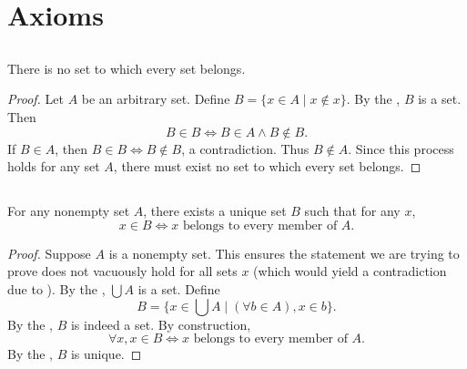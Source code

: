 \documentclass{report}
\begin{document}
\section{Axioms}%

\subsection{}%

\begin{theorem}[2A]

  There is no set to which every set belongs.


\end{theorem}

\begin{proof}

  Let $A$ be an arbitrary set.
  Define $B = \{ x \in A \mid x \not\in x \}$.
  By the , $B$ is a set.
  Then $$B \in B \iff B \in A \land B \not\in B.$$
  If $B \in A$, then $B \in B \iff B \not\in B$, a contradiction.
  Thus $B \not\in A$.
  Since this process holds for any set $A$, there must exist no set to which
    every set belongs.

\end{proof}

\subsection{}%

\begin{theorem}[2B]

  For any nonempty set $A$, there exists a unique set $B$ such that for any
    $x$, $$x \in B \iff x \text{ belongs to every member of } A.$$

\end{theorem}

\begin{proof}

  Suppose $A$ is a nonempty set.
  This ensures the statement we are trying to prove does not vacuously hold for
    all sets $x$ (which would yield a contradiction due to
    ).
  By the , $\bigcup A$ is a set.
  Define $$B = \{ x \in \bigcup A \mid (\forall b \in A), x \in b \}.$$
  By the , $B$ is indeed a set.
  By construction,
    $$\forall x, x \in B \iff x \text{ belongs to every member of } A.$$
  By the , $B$ is unique.

\end{proof}
\end{document}
